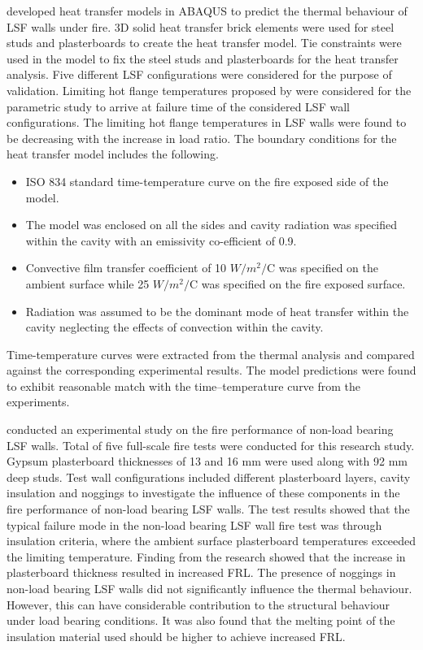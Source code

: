 \citet{Rusthi2017} developed heat transfer models in ABAQUS to predict the thermal behaviour of LSF walls under fire. 3D solid heat transfer brick elements were used for steel studs and plasterboards to create the heat transfer model. Tie constraints were used in the model to fix the steel studs and plasterboards for the heat transfer analysis. Five different LSF configurations were considered for the purpose of validation. Limiting hot flange temperatures proposed by \citet{Gunalan2013e,Ariyanayagam2014e} were considered for the parametric study to arrive at failure time of the considered LSF wall configurations. The limiting hot flange temperatures in LSF walls were found to be decreasing with the increase in load ratio. The boundary conditions for the heat transfer model includes the following.
\begin{itemize}
	\item ISO 834 standard time-temperature curve on the fire exposed side of the model.
	\item The model was enclosed on all the sides and cavity radiation was specified within the cavity with an emissivity co-efficient of 0.9.
	\item Convective film transfer coefficient of 10 $W/m^2/$\degree C was specified on the ambient surface while 25 $W/m^2/$\degree C was specified on the fire exposed surface.
	\item Radiation was assumed to be the dominant mode of heat transfer within the cavity neglecting the effects of convection within the cavity.
\end{itemize}
Time-temperature curves were extracted from the thermal analysis and compared against the corresponding experimental results. The model predictions were found to exhibit reasonable match with the time–temperature curve from the experiments.

\citet{Ariyanayagam2018a} conducted an experimental study on the fire performance of non-load bearing LSF walls. Total of five full-scale fire tests were conducted for this research study. Gypsum plasterboard thicknesses of 13 and 16 mm were used along with 92 mm deep studs. Test wall configurations included different plasterboard layers, cavity insulation and noggings to investigate the influence of these components in the fire performance of non-load bearing LSF walls. The test results showed that the typical failure mode in the non-load bearing LSF wall fire test was through insulation criteria, where the ambient surface plasterboard temperatures exceeded the limiting temperature. Finding from the research showed that the increase in plasterboard thickness resulted in increased FRL. The presence of noggings in non-load bearing LSF walls did not significantly influence the thermal behaviour. However, this can have considerable contribution to the structural behaviour under load bearing conditions. It was also found that the melting point of the insulation material used should be higher to achieve increased FRL. 

